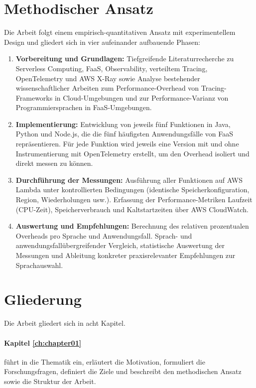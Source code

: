 \section{Methodischer Ansatz}
\label{sec:intro:methode}

Die Arbeit folgt einem empirisch-quantitativen Ansatz mit experimentellem Design und gliedert sich in vier aufeinander aufbauende Phasen:

\begin{enumerate}
    \item \textbf{Vorbereitung und Grundlagen:} 
    Tiefgreifende Literaturrecherche zu Serverless Computing, \ac{FaaS}, Observability, verteiltem Tracing, OpenTelemetry und AWS X-Ray 
    sowie Analyse bestehender wissenschaftlicher Arbeiten zum Performance-Overhead von Tracing-Frameworks in Cloud-Umgebungen und zur Performance-Varianz von Programmiersprachen in \ac{FaaS}-Umgebungen.

    \item \textbf{Implementierung:} 
    Entwicklung von jeweils fünf Funktionen in Java, Python und Node.js, die die fünf häufigsten Anwendungsfälle von \ac{FaaS} repräsentieren.
    Für jede Funktion wird jeweils eine Version mit und ohne Instrumentierung mit OpenTelemetry erstellt, um den Overhead isoliert und direkt messen zu können.

    
    \item \textbf{Durchführung der Messungen:} 
    Ausführung aller Funktionen auf AWS Lambda unter kontrollierten Bedingungen (identische Speicherkonfiguration, Region, Wiederholungen usw.). 
    Erfassung der Performance-Metriken Laufzeit (CPU-Zeit), Speicherverbrauch und Kaltstartzeiten über AWS CloudWatch.
    
    \item \textbf{Auswertung und Empfehlungen:} 
    Berechnung des relativen prozentualen Overheads pro Sprache und Anwendungsfall. Sprach- und anwendungsfallübergreifender Vergleich, 
    statistische Auswertung der Messungen und Ableitung konkreter praxisrelevanter Empfehlungen zur Sprachauswahl.
\end{enumerate}

%
%
\section{Gliederung}
\label{sec:intro:structure}

Die Arbeit gliedert sich in acht Kapitel.
\paragraph{Kapitel \ref{ch:chapter01}} führt in die Thematik ein, erläutert die Motivation, formuliert die Forschungsfragen, definiert die Ziele und beschreibt den methodischen Ansatz sowie die Struktur der Arbeit.


